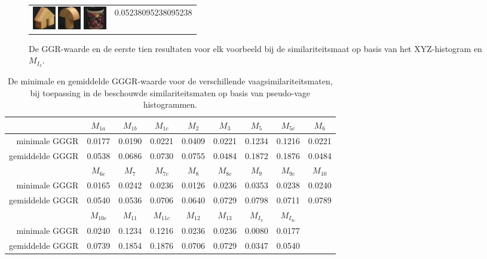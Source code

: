 \begin{figure}[!bp]
\begin{tabular}{m{11cm} | m{3cm} |}
\includegraphics[width=1cm]{coil/beeld-45.eps}
\includegraphics[width=1cm]{coil/beeld-4.eps}
\includegraphics[width=1cm]{coil/beeld-62.eps}
& {\scriptsize 0.05238095238095238}
\\
\end{tabular}
\vspace{5pt}
\caption{\label{fig:results_xyz_histgeb}De GGR-waarde en de eerste tien resultaten 
voor elk voorbeeld bij de similariteitsmaat op basis van het XYZ-histogram en $M_{I_3}$.}
\end{figure}
%
%
\begin{table}[bp]
\vspace{10pt}
\centering
\small
\begin{tabular}{r|cccccccc}
& $M_{1a}$ & $M_{1b}$ & $M_{1c}$ & $M_{2}$ & $M_{3}$ & $M_{5}$ & $M_{5c}$ & $M_{6}$ \\
\hline
minimale GGGR & 0.0177 & 0.0190 & 0.0221 & 0.0409 & 0.0221 & 0.1234 & 0.1216 & 0.0221 \\
gemiddelde GGGR & 0.0538 & 0.0686 & 0.0730 & 0.0755 & 0.0484 & 0.1872 & 0.1876 & 0.0484\vspace{8pt}\\
& $M_{6c}$ & $M_{7}$ & $M_{7c}$ & $M_{8}$ & $M_{8c}$ & $M_{9}$ & $M_{9c}$ & $M_{10}$ \\
\hline
minimale GGGR & 0.0165 & 0.0242 & 0.0236 & 0.0126 & 0.0236 & 0.0353 & 0.0238 & 0.0240 \\
gemiddelde GGGR & 0.0540 & 0.0536 & 0.0706 & 0.0640 & 0.0729 & 0.0798 & 0.0711 & 0.0789\vspace{8pt}\\
& $M_{10c}$ & $M_{11}$ & $M_{11c}$ & $M_{12}$ & $M_{13}$ & $M_{I_3}$ & $M_{I_{3c}}$ \\
\hline
minimale GGGR & 0.0240 & 0.1234 & 0.1216 & 0.0236 & 0.0236 & 0.0080 & 0.0177 \\
gemiddelde GGGR & 0.0739 & 0.1854 & 0.1876 & 0.0706 & 0.0729 & 0.0347 & 0.0540
\end{tabular}
\vspace{10pt}
\caption{\label{tab:stat_gegevens_pseudo-vaag_histogram_maten}De minimale en gemiddelde 
GGGR-waarde voor 
de verschillende vaagsimilariteitsmaten, bij toepassing in de beschouwde  
similariteitsmaten op basis van pseudo-vage histogrammen.}
\end{table}

